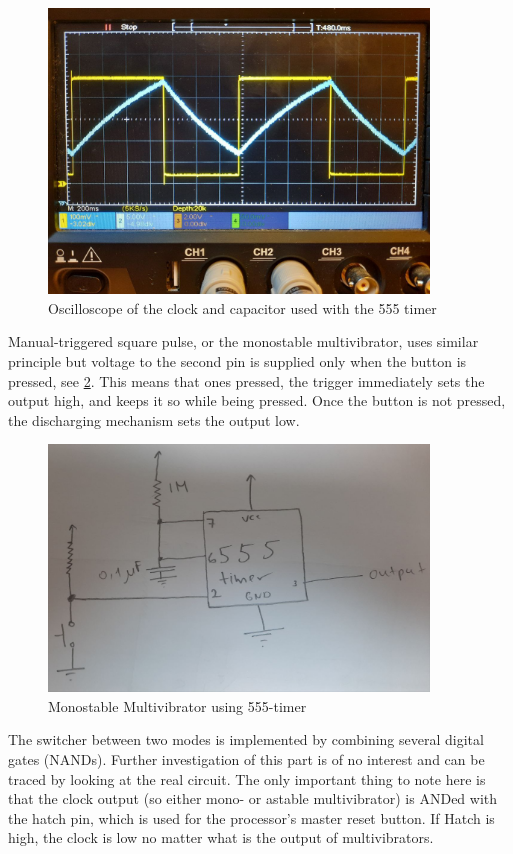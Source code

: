 \begin{figure}[H]
	\centering
	\includegraphics[width=0.9\textwidth]{img/clock_scope}
	\caption{Oscilloscope of the clock and capacitor used with the 555 timer}
	\label{fig:clock_scope}
\end{figure}

Manual-triggered square pulse, or the monostable multivibrator, uses similar principle but voltage to the second pin is supplied only when the button is pressed, see \ref{fig:monostable}. This means that ones pressed, the trigger immediately sets the output high, and keeps it so while being pressed. Once the button is not pressed, the discharging mechanism sets the output low.

\begin{figure}[H]
	\centering
	\includegraphics[width=0.9\textwidth]{img/monostable}
	\caption{Monostable Multivibrator using 555-timer}
	\label{fig:monostable}
\end{figure}

The switcher between two modes is implemented by combining several digital gates (NANDs). Further investigation of this part is of no interest and can be traced by looking at the real circuit. The only important thing to note here is that the clock output (so either mono- or astable multivibrator) is ANDed with the hatch pin, which is used for the processor's master reset button. If Hatch is high, the clock is low no matter what is the output of multivibrators.


